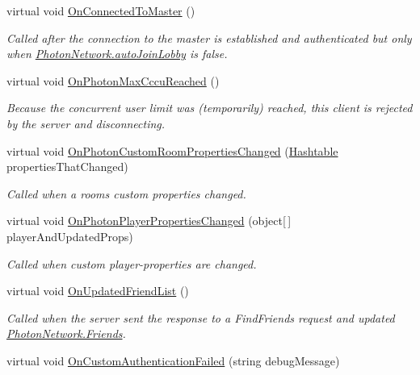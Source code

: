 \begin{DoxyCompactItemize}
virtual void \hyperlink{class_photon_1_1_pun_behaviour_ad77f0474fa75a37a3a39e96aa386ab09}{On\+Connected\+To\+Master} ()
\begin{DoxyCompactList}\small\item\em Called after the connection to the master is established and authenticated but only when \hyperlink{class_photon_network_ad534d4da7222bd8a6d8423cbd238d7f4}{Photon\+Network.\+auto\+Join\+Lobby} is false. \end{DoxyCompactList}\item 
virtual void \hyperlink{class_photon_1_1_pun_behaviour_adcef9694244295ad493bc4ec0b4463d4}{On\+Photon\+Max\+Cccu\+Reached} ()
\begin{DoxyCompactList}\small\item\em Because the concurrent user limit was (temporarily) reached, this client is rejected by the server and disconnecting. \end{DoxyCompactList}\item 
virtual void \hyperlink{class_photon_1_1_pun_behaviour_abf25d63a39ef13cb9a0519e6e7672a2f}{On\+Photon\+Custom\+Room\+Properties\+Changed} (\hyperlink{namespace_photon_ac2f4b49a218ef814d00e31cd5f32bf4e}{Hashtable} properties\+That\+Changed)
\begin{DoxyCompactList}\small\item\em Called when a room\textquotesingle{}s custom properties changed. \end{DoxyCompactList}\item 
virtual void \hyperlink{class_photon_1_1_pun_behaviour_aaec2f5973228b99c6ad781d5cedadb6f}{On\+Photon\+Player\+Properties\+Changed} (object\mbox{[}$\,$\mbox{]} player\+And\+Updated\+Props)
\begin{DoxyCompactList}\small\item\em Called when custom player-\/properties are changed. \end{DoxyCompactList}\item 
virtual void \hyperlink{class_photon_1_1_pun_behaviour_a443380e89534a70dfe4ce7ca16083035}{On\+Updated\+Friend\+List} ()
\begin{DoxyCompactList}\small\item\em Called when the server sent the response to a Find\+Friends request and updated \hyperlink{class_photon_network_afd22fd553d52fdc63e975c32ea47514f}{Photon\+Network.\+Friends}. \end{DoxyCompactList}\item 
virtual void \hyperlink{class_photon_1_1_pun_behaviour_ade038a534b66b6d9a5faad53e21e22c9}{On\+Custom\+Authentication\+Failed} (string debug\+Message)

\end{DoxyCompactItemize}
